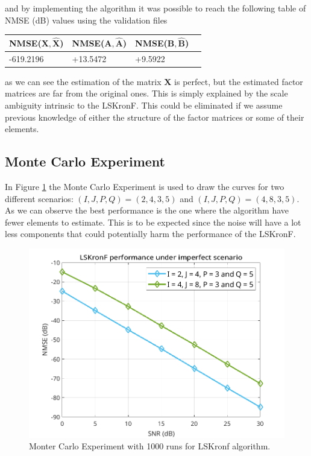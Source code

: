 \documentclass[a4paper,10pt]{article}
\begin{document}
    and by implementing the algorithm it was possible to reach the following table of NMSE (dB) values using the validation files 

    \begin{table}[ht!]
        \centering
        \begin{tabular}{|l|l|l|l|}
        \hline
        NMSE($\boldsymbol{X}, \boldsymbol{\hat{X}}$) & NMSE($\boldsymbol{A}, \boldsymbol{\hat{A}}$) & NMSE($\boldsymbol{B}, \boldsymbol{\hat{B}}$) \\ \hline
        -619.2196 & +13.5472 & +9.5922 \\ \hline
        \end{tabular}
    \end{table}

    as we can see the estimation of the matrix $\boldsymbol{X}$ is perfect, but the estimated factor matrices are far from the original ones. This is simply explained by 
    the scale ambiguity intrinsic to the LSKronF. This could be eliminated if we assume previous knowledge of either the structure of the factor matrices or some of their elements.
    
    \subsection*{Monte Carlo Experiment}

    In Figure \ref{fig:hw4} the Monte Carlo Experiment is used to draw the curves for two different scenarios: $(I,J,P,Q) = (2,4,3,5)$ and $(I,J,P,Q) = (4,8,3,5)$. 
    As we can observe the best performance is the one where the algorithm have fewer elements to estimate. This is to be expected since the noise will have a lot less
    components that could potentially harm the performance of the LSKronF.

    \begin{figure}[ht!]
        \centering 
        \includegraphics[width=0.75\linewidth]{figs/hw4.png} \par 
        \caption{Monter Carlo Experiment with 1000 runs for LSKronf algorithm.}
        \label{fig:hw4} 
    \end{figure}
\end{document}
